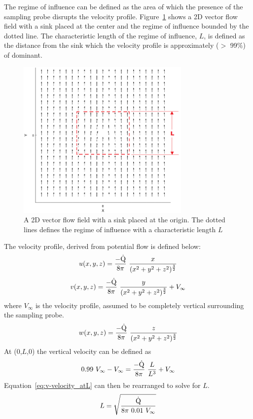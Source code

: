 \documentclass[12pt]{article}
\begin{document}
The regime of influence can be defined as the area of which the presence of the sampling probe disrupts the velocity profile. Figure~\ref{fig:Potential Flow} shows a 2D vector flow field with a sink placed at the center and the regime of influence bounded by the dotted line. The characteristic length of the regime of influence, $L$, is defined as the distance from the sink which the velocity profile is approximately ($>$ 99\%) of dominant.
\begin{figure}[h!]
	\centering
\includegraphics[width=8.45cm,keepaspectratio]{Potential_Flow.png}
	\caption{A 2D vector flow field with a sink placed at the origin. The dotted lines defines the regime of influence with a characteristic length $L$}
	\label{fig:Potential Flow}
\end{figure}

The velocity profile, derived from potential flow is defined below:
\begin{equation}
\label{eq:u-velocity}
u(x,y,z)=\frac{-\rm{\dot{Q}}}{8\pi}~\frac{x}{({x^2+y^2+z^2})^{\frac{3}{2}}}
\end{equation}
\begin{equation}
\label{eq:v-velocity}
v(x,y,z)=\frac{-\rm{\dot{Q}}}{8\pi}~\frac{y}{({x^2+y^2+z^2})^{\frac{3}{2}}}+V_{\infty}
\end{equation}
where $V_{\infty}$ is the velocity profile, assumed to be completely vertical surrounding the sampling probe.
\begin{equation}
\label{eq:w-velocity}
w(x,y,z)=\frac{-\rm{\dot{Q}}}{8\pi}~\frac{z}{({x^2+y^2+z^2})^{\frac{3}{2}}}
\end{equation}
At (0,$L$,0) the vertical velocity can be defined as
\begin{equation}
\label{eq:v-velocity_atL}
0.99~V_{\infty}-V_{\infty}=\frac{-\rm{\dot{Q}}}{8\pi}~\frac{L}{L^3}+V_{\infty}
\end{equation}
Equation~\ref{eq:v-velocity_atL} can then be rearranged to solve for $L$.
\begin{equation}
\label{eq:char_length}
L=\sqrt{\frac{\rm{\dot{Q}}}{8\pi~0.01~V_{\infty}}}
\end{equation}
\end{document}
